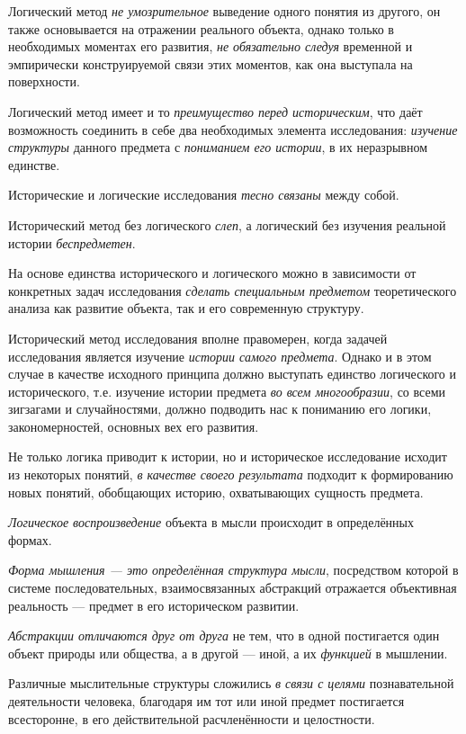 \documentclass[a4paper,14pt,russian]{extreport}
\begin{document}
Логический метод \emph{не умозрительное} выведение одного понятия из другого, он также основывается на отражении реального объекта, однако только в необходимых моментах его развития, \emph{не обязательно следуя} временной и эмпирически конструируемой связи этих моментов, как она выступала на поверхности.

Логический метод имеет и то \emph{преимущество перед историческим}, что даёт возможность соединить в себе два необходимых элемента исследования: \emph{изучение структуры} данного предмета с \emph{пониманием его истории}, в их неразрывном единстве.

Исторические и логические исследования \emph{тесно связаны} между собой.

Исторический метод без логического \emph{слеп}, а логический без изучения реальной истории \emph{беспредметен}.

На основе единства исторического и логического можно в зависимости от конкретных задач исследования \emph{сделать специальным предметом} теоретического анализа как развитие объекта, так и его современную структуру.

Исторический метод исследования вполне правомерен, когда задачей исследования является изучение \emph{истории самого предмета}. Однако и в этом случае в качестве исходного принципа должно выступать единство логического и исторического, т.е. изучение истории предмета \emph{во всем многообразии}, со всеми зигзагами и случайностями, должно подводить нас к пониманию его логики, закономерностей, основных вех его развития.

Не только логика приводит к истории, но и историческое исследование исходит из некоторых понятий, \emph{в качестве своего результата} подходит к формированию новых понятий, обобщающих историю, охватывающих сущность предмета.

\emph{Логическое воспроизведение} объекта в мысли происходит в определённых формах.

\emph{Форма мышления --- это определённая структура мысли}, посредством которой в системе последовательных, взаимосвязанных абстракций отражается объективная реальность --- предмет в его историческом развитии.

\emph{Абстракции отличаются друг от друга} не тем, что в одной постигается один объект природы или общества, а в другой --- иной, а их \emph{функцией} в мышлении.

Различные мыслительные структуры сложились \emph{в связи с целями} познавательной деятельности человека, благодаря им тот или иной предмет постигается всесторонне, в его действительной расчленённости и целостности.
\end{document}
